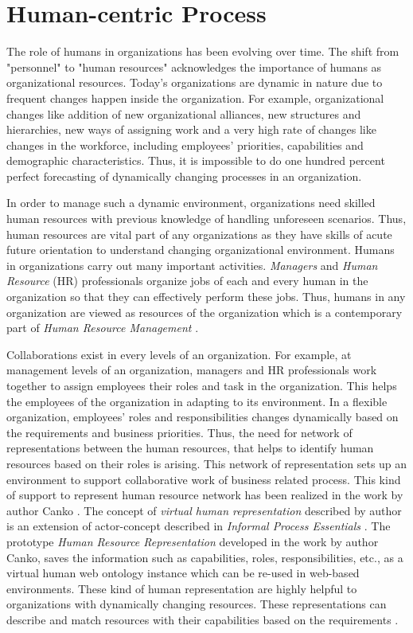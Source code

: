 \section{Human-centric Process}
\label{sec:humancentric}
The role of humans in organizations has been evolving over time. The shift from "personnel" to "human resources" acknowledges the importance of humans as organizational resources. Today's organizations are dynamic in nature due to frequent changes happen inside the organization. For example, organizational changes like addition of new organizational alliances, new structures and hierarchies, new ways of assigning work and a very high rate of changes like changes in the workforce, including employees' priorities, capabilities and demographic characteristics. Thus, it is impossible to do one hundred percent perfect forecasting of dynamically changing processes in an organization.

In order to manage such a dynamic environment, organizations need skilled human resources with previous knowledge of handling unforeseen scenarios. Thus, human resources are vital part of any organizations as they have skills of acute future orientation to understand changing organizational environment. Humans in organizations carry out many important activities. \textit{Managers} and \textit{Human Resource} (HR) professionals organize jobs of each and every human in the organization so that they can effectively perform these jobs. Thus, humans in any organization are viewed as resources of the organization which is a contemporary part of \textit{Human Resource Management} \cite{Bianca2016}.

Collaborations exist in every levels of an organization. For example, at management levels of an organization, managers and HR professionals work together to assign employees their roles and task in the organization. This helps the employees of the organization in adapting to its environment. In a flexible organization, employees' roles and responsibilities changes dynamically based on the requirements and business priorities. Thus, the need for network of representations between the human resources, that helps to identify human resources based on their roles is arising. This network of representation sets up an environment to support collaborative work of business related process. This kind of support to represent human resource network has been realized in the work by author Canko \cite{Canko2015}. The concept of \textit{virtual human representation} described by author is an extension of actor-concept described in \textit{Informal Process Essentials} \cite{Sungur2014a}. The prototype \textit{Human Resource Representation} developed in the work by author Canko, saves the information such as capabilities, roles, responsibilities, etc., as a virtual human web ontology instance which can be re-used in web-based environments. These kind of human representation are highly helpful to organizations with dynamically changing resources. These representations can describe and match resources with their capabilities based on the requirements \cite{Canko2015}.


